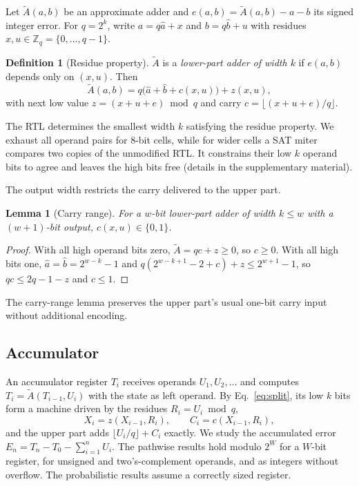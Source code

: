 \documentclass[preprint,12pt,numbers]{elsarticle}
\newcommand{\Z}{\mathbb{Z}}
\newtheorem{lemma}{Lemma}
\theoremstyle{definition}
\newtheorem{definition}{Definition}
\begin{document}
Let $\widetilde A(a,b)$ be an approximate adder and
$e(a,b)=\widetilde A(a,b)-a-b$ its signed integer error. For $q=2^k$, write
$a=q\hat a+x$ and $b=q\hat b+u$ with residues $x,u\in\Z_q=\{0,\ldots,q-1\}$.

\begin{definition}[Residue property]
$\widetilde A$ is a \emph{lower-part adder of width $k$} if $e(a,b)$ depends
only on $(x,u)$. Then
\begin{equation}
\widetilde A(a,b)=q\bigl(\hat a+\hat b+c(x,u)\bigr)+z(x,u),
\label{eq:split}
\end{equation}
with next low value $z=(x+u+e)\bmod q$ and carry $c=\lfloor (x+u+e)/q\rfloor$.
\end{definition}

The RTL determines the smallest width $k$ satisfying the residue property.
We exhaust all operand pairs for 8-bit cells, while for wider cells a SAT
miter compares two copies of the unmodified RTL. It constrains their
low $k$ operand bits to agree and leaves the high bits free
(details in the supplementary material).

The output width restricts the carry delivered to the upper part.
\begin{lemma}[Carry range]\label{lem:carry}
For a $w$-bit lower-part adder of width $k\le w$ with a $(w{+}1)$-bit output,
$c(x,u)\in\{0,1\}$.
\end{lemma}
\begin{proof}
With all high operand bits zero, $\widetilde A=qc+z\ge0$, so $c\ge0$. With all
high bits one, $\hat a=\hat b=2^{w-k}-1$ and
$q(2^{w-k+1}-2+c)+z\le2^{w+1}-1$, so $qc\le2q-1-z$ and $c\le1$.
\end{proof}

The carry-range lemma preserves the upper part's usual one-bit carry
input without additional encoding.

\subsection{Accumulator}
An accumulator register $T_i$ receives operands $U_1,U_2,\ldots$ and
computes $T_i=\widetilde A(T_{i-1},U_i)$ with the state as left operand.
By Eq.~\eqref{eq:split}, its low $k$ bits form a machine driven by
the residues $R_i=U_i\bmod q$,
\begin{equation}
X_i=z(X_{i-1},R_i),\qquad C_i=c(X_{i-1},R_i),
\label{eq:machine}
\end{equation}
and the upper part adds $\lfloor U_i/q\rfloor+C_i$ exactly. We study the
accumulated error $E_n=T_n-T_0-\sum_{i=1}^nU_i$. The pathwise results hold
modulo $2^W$ for a $W$-bit register, for unsigned and two's-complement
operands, and as integers without overflow. The probabilistic results assume
a correctly sized register.
\end{document}
